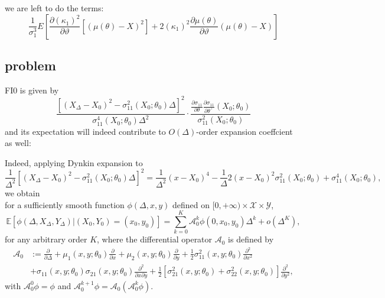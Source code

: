 \documentclass[11pt]{article}%
\theoremstyle{definition}
\begin{document}
we are left to do the terms:%
\[
\frac{1}{\sigma_{1}^{3}}E\left[  \frac{\partial(\kappa_{1})^{2}}%
{\partial\vartheta}\left[  {(\mu(\theta)-X)}^{2}\right]  +2(\kappa_{1}%
)^{2}\frac{\partial{\mu(\theta)}}{\partial\vartheta}{(\mu(\theta)-X)}\right]
\]


\bigskip

\subsection{problem}

\bigskip

FI0 is given by%
\[
\frac{\left[  (X_{\Delta}-X_{0})^{2}-\sigma_{11}^{2}(X_{0};\theta_{0}%
)\Delta\right]  ^{2}}{\sigma_{11}^{4}(X_{0};\theta_{0})\Delta^{2}}\cdot
\frac{\frac{\partial\sigma_{11}}{\partial\theta}\frac{\partial\sigma_{11}%
}{\partial\theta^{\intercal}}(X_{0};\theta_{0})}{\sigma_{11}^{2}(X_{0}%
;\theta_{0})}%
\]
and its expectation will indeed contribute to $O(\Delta)$-order expansion
coeffcient as well:

Indeed, applying Dynkin expansion to%
\[
\frac{1}{\Delta^{2}}\left[  (X_{\Delta}-X_{0})^{2}-\sigma_{11}^{2}%
(X_{0};\theta_{0})\Delta\right]  ^{2}=\frac{1}{\Delta^{2}}(x-X_{0})^{4}%
-\frac{1}{\Delta}2(x-X_{0})^{2}\sigma_{11}^{2}(X_{0};\theta_{0})+\sigma
_{11}^{4}(X_{0};\theta_{0}),
\]
we obtain%
\[
\]
for a sufficiently smooth function $\phi(\Delta,x,y)$ defined on
$[0,+\infty)\times\mathcal{X}\times\mathcal{Y}$,%
\begin{equation}
\mathbb{E}\left[  \phi(\Delta,X_{\Delta},Y_{\Delta})|(X_{0},Y_{0}%
)=(x_{0},y_{0})\right]  =\sum_{k=0}^{K}\mathcal{A}_{0}^{k}\phi(0,x_{0}%
,y_{0})\Delta^{k}+o(\Delta^{K}), \label{iterated Dynkin formula}%
\end{equation}
for any arbitrary order $K$, where the differential operator $\mathcal{A}_{0}$
is defined by%
\begin{align}
\mathcal{A}_{0}  &  :=\frac{\partial}{\partial\Delta}+\mu_{1}\left(
x,y;\theta_{0}\right)  \frac{\partial}{\partial x}+\mu_{2}\left(
x,y;\theta_{0}\right)  \frac{\partial}{\partial y}+\frac{1}{2}\sigma_{11}%
^{2}\left(  x,y;\theta_{0}\right)  \frac{\partial^{2}}{\partial x^{2}%
}\nonumber\\
&  +\sigma_{11}\left(  x,y;\theta_{0}\right)  \sigma_{21}\left(
x,y;\theta_{0}\right)  \frac{\partial^{2}}{\partial x\partial y}+\frac{1}%
{2}\left[  \sigma_{21}^{2}\left(  x,y;\theta_{0}\right)  +\sigma_{22}%
^{2}\left(  x,y;\theta_{0}\right)  \right]  \frac{\partial^{2}}{\partial
y^{2}}, \label{A0_operator}%
\end{align}
with $\mathcal{A}_{0}^{0}\phi=\phi$ and $\mathcal{A}_{0}^{k+1}\phi
=\mathcal{A}_{0}(\mathcal{A}_{0}^{k}\phi)$.
\end{document}
